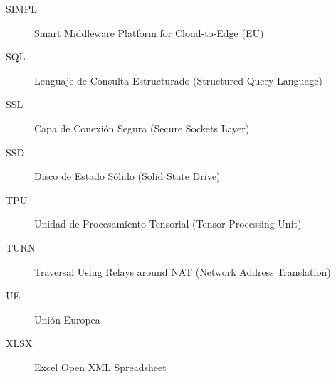 \begin{description}
	\item[SIMPL] Smart Middleware Platform for Cloud-to-Edge (EU)
	\item[SQL] Lenguaje de Consulta Estructurado (Structured Query Language)
	\item[SSL] Capa de Conexión Segura (Secure Sockets Layer)
	\item[SSD] Disco de Estado Sólido (Solid State Drive)
	\item[TPU] Unidad de Procesamiento Tensorial (Tensor Processing Unit)
	\item[TURN] Traversal Using Relays around NAT (Network Address Translation)
	\item[UE] Unión Europea
	\item[XLSX] Excel Open XML Spreadsheet
	
\end{description}


 \newpage
